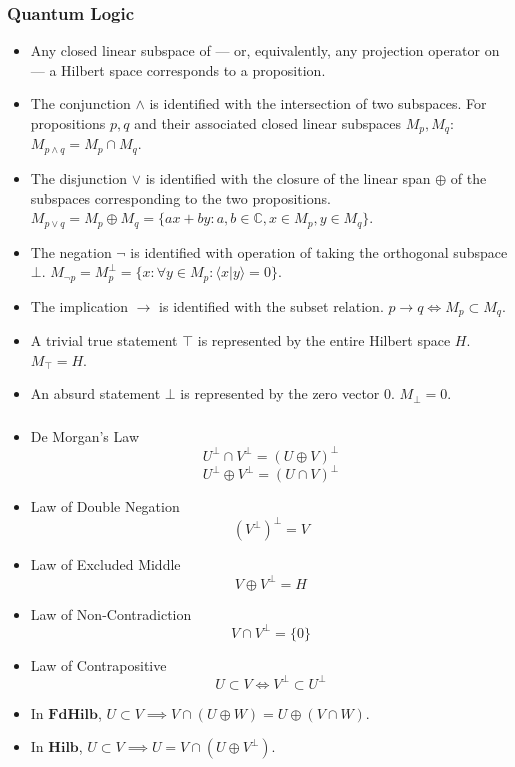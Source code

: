 \documentclass[UTF8,aspectratio=43,11pt,colorlinks,compress,openany]{beamer}%
\begin{document}
\begin{frame}\frametitle{Quantum Logic}
\begin{itemize}
	\item Any closed linear subspace of --- or, equivalently, any projection operator on --- a Hilbert space corresponds to a proposition.
	\item The conjunction $\wedge$ is identified with the intersection of two subspaces. For propositions $p,q$ and their associated closed linear subspaces $M_p,M_q$: $M_{p\wedge q}=M_p\cap M_q$.
	\item The disjunction $\vee$ is identified with the closure of the linear span $\oplus$ of the subspaces corresponding to the two propositions. $M_{p\vee q}=M_p\oplus M_q=\{ax+by: a,b\in\mathbb{C}, x\in M_p, y\in M_q\}$.
	\item The negation $\neg$ is identified with operation of taking the orthogonal subspace $\bot$. $M_{\neg p}=M_p^\bot=\{x:\forall y\in M_p:\langle x|y\rangle=0\}$.
	\item The implication $\to$ is identified with the subset relation. $p\to q\iff M_p\subset M_q$.
	\item A trivial true statement $\top$ is represented by the entire Hilbert space $H$. $M_\top=H$.
	\item An absurd statement $\bot$ is represented by the zero vector $0$. $M_\bot=0$.
\end{itemize}
\end{frame}

\begin{frame}\frametitle{}
\begin{itemize}
	\item De Morgan's Law
	\[U^\bot\cap V^\bot=(U\oplus V)^\bot\]
	\[U^\bot\oplus V^\bot=(U\cap V)^\bot\]
	\item Law of Double Negation
	\[(V^\bot)^\bot=V\]
	\item Law of Excluded Middle
	\[V\oplus V^\bot=H\]
	\item Law of Non-Contradiction
	\[V\cap V^\bot=\{0\}\]
	\item Law of Contrapositive
	\[U\subset V\iff V^\bot\subset U^\bot\]
	\item In $\mathbf{FdHilb}$, $U\subset V\implies V\cap (U\oplus W)=U\oplus(V\cap W)$.
	\item In $\mathbf{Hilb}$, $U\subset V\implies U=V\cap(U\oplus V^\bot)$.
\end{itemize}
\end{frame}
\end{document}
